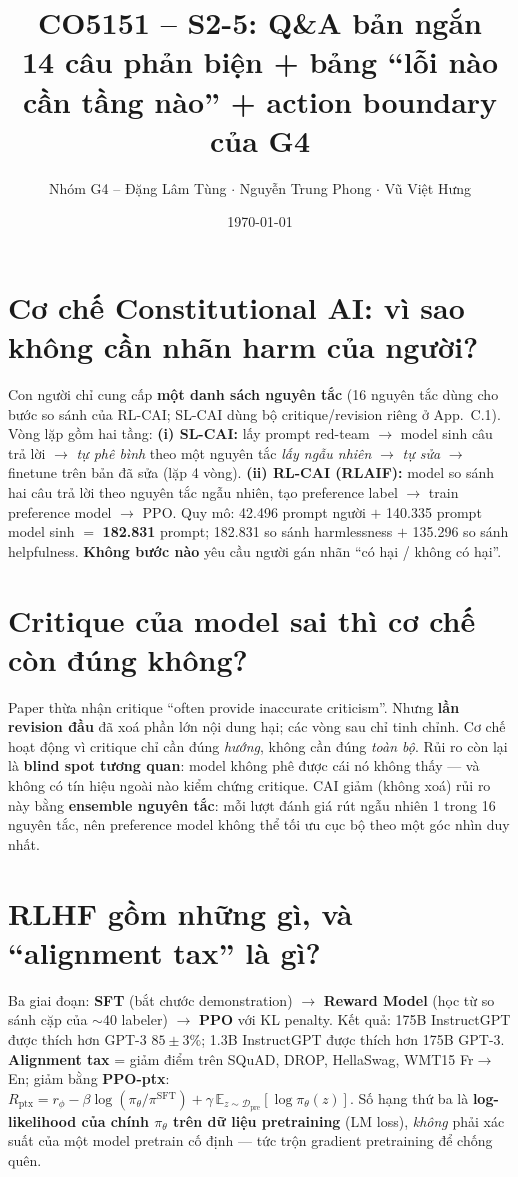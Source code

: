 \documentclass[10pt,a4paper]{article}
\title{\vspace{-1.1cm}\textbf{\color{hcmutblue}CO5151 -- S2-5: Q\&A bản ngắn}\\[1pt]
\large 14 câu phản biện + bảng ``lỗi nào cần tầng nào'' + action boundary của G4}
\author{\small Nhóm G4 -- Đặng Lâm Tùng $\cdot$ Nguyễn Trung Phong $\cdot$ Vũ Việt Hưng}
\date{\small \today}
\begin{document}
\maketitle

\section{Cơ chế Constitutional AI: vì sao không cần nhãn harm của người?}
Con người chỉ cung cấp \textbf{một danh sách nguyên tắc} (16 nguyên tắc dùng cho bước so sánh của RL-CAI; SL-CAI dùng bộ critique/revision riêng ở App.~C.1). Vòng lặp gồm hai tầng:
\textbf{(i) SL-CAI:} lấy prompt red-team $\to$ model sinh câu trả lời $\to$ \emph{tự phê bình} theo một nguyên tắc
\emph{lấy ngẫu nhiên} $\to$ \emph{tự sửa} $\to$ finetune trên bản đã sửa (lặp 4 vòng).
\textbf{(ii) RL-CAI (RLAIF):} model so sánh hai câu trả lời theo nguyên tắc ngẫu nhiên, tạo preference label
$\to$ train preference model $\to$ PPO. Quy mô: 42.496 prompt người $+$ 140.335 prompt model sinh $=$
\textbf{182.831} prompt; 182.831 so sánh harmlessness $+$ 135.296 so sánh helpfulness.
\textbf{Không bước nào} yêu cầu người gán nhãn ``có hại / không có hại''.

\section{Critique của model sai thì cơ chế còn đúng không?}
Paper thừa nhận critique ``often provide inaccurate criticism''. Nhưng \textbf{lần revision đầu} đã xoá phần lớn nội dung
hại; các vòng sau chỉ tinh chỉnh. Cơ chế hoạt động vì critique chỉ cần đúng \emph{hướng}, không cần đúng \emph{toàn bộ}.
Rủi ro còn lại là \textbf{blind spot tương quan}: model không phê được cái nó không thấy --- và không có tín hiệu ngoài
nào kiểm chứng critique. CAI giảm (không xoá) rủi ro này bằng \textbf{ensemble nguyên tắc}: mỗi lượt đánh giá rút ngẫu nhiên
1 trong 16 nguyên tắc, nên preference model không thể tối ưu cục bộ theo một góc nhìn duy nhất.

\section{RLHF gồm những gì, và ``alignment tax'' là gì?}
Ba giai đoạn: \textbf{SFT} (bắt chước demonstration) $\to$ \textbf{Reward Model} (học từ so sánh cặp của $\sim$40 labeler)
$\to$ \textbf{PPO} với KL penalty. Kết quả: 175B InstructGPT được thích hơn GPT-3 $85\pm3\%$; 1.3B InstructGPT được
thích hơn 175B GPT-3. \textbf{Alignment tax} = giảm điểm trên SQuAD, DROP, HellaSwag, WMT15 Fr$\to$En; giảm bằng
\textbf{PPO-ptx}: $R_{\text{ptx}} = r_\phi - \beta\log(\pi_\theta/\pi^{\text{SFT}}) + \gamma\,\mathbb{E}_{z\sim\mathcal{D}_{\text{pre}}}[\log \pi_\theta(z)]$.
Số hạng thứ ba là \textbf{log-likelihood của chính $\pi_\theta$ trên dữ liệu pretraining} (LM loss), \emph{không} phải xác suất
của một model pretrain cố định --- tức trộn gradient pretraining để chống quên.
\end{document}
